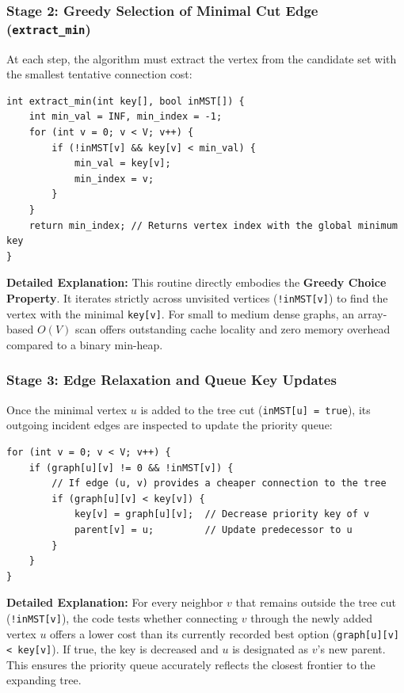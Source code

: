 \documentclass[11pt,a4paper]{article}
\begin{document}
\subsubsection{Stage 2: Greedy Selection of Minimal Cut Edge (\texttt{extract\_min})}
At each step, the algorithm must extract the vertex from the candidate set with the smallest tentative connection cost:

\begin{lstlisting}[style=cstyle, caption={Linear-scan minimum extraction from candidate cut}]
int extract_min(int key[], bool inMST[]) {
    int min_val = INF, min_index = -1;
    for (int v = 0; v < V; v++) {
        if (!inMST[v] && key[v] < min_val) {
            min_val = key[v];
            min_index = v;
        }
    }
    return min_index; // Returns vertex index with the global minimum key
}
\end{lstlisting}

\noindent \textbf{Detailed Explanation:}
This routine directly embodies the \textbf{Greedy Choice Property}. It iterates strictly across unvisited vertices (\texttt{!inMST[v]}) to find the vertex with the minimal \texttt{key[v]}. For small to medium dense graphs, an array-based $O(V)$ scan offers outstanding cache locality and zero memory overhead compared to a binary min-heap.

\subsubsection{Stage 3: Edge Relaxation and Queue Key Updates}
Once the minimal vertex $u$ is added to the tree cut (\texttt{inMST[u] = true}), its outgoing incident edges are inspected to update the priority queue:

\begin{lstlisting}[style=cstyle, caption={Edge relaxation and neighbor key updates}]
for (int v = 0; v < V; v++) {
    if (graph[u][v] != 0 && !inMST[v]) {
        // If edge (u, v) provides a cheaper connection to the tree
        if (graph[u][v] < key[v]) {
            key[v] = graph[u][v];  // Decrease priority key of v
            parent[v] = u;         // Update predecessor to u
        }
    }
}
\end{lstlisting}

\noindent \textbf{Detailed Explanation:}
For every neighbor $v$ that remains outside the tree cut (\texttt{!inMST[v]}), the code tests whether connecting $v$ through the newly added vertex $u$ offers a lower cost than its currently recorded best option (\texttt{graph[u][v] < key[v]}). If true, the key is decreased and $u$ is designated as $v$'s new parent. This ensures the priority queue accurately reflects the closest frontier to the expanding tree.
\end{document}

